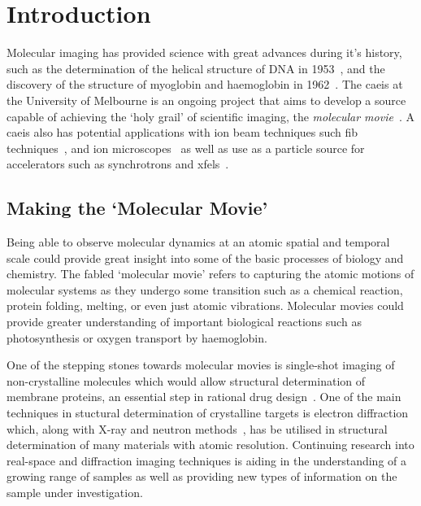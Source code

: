  \chapter{Introduction}
 
\setcounter{page}{1}

Molecular imaging has provided science with great advances during it's history, such as the determination of the helical structure of DNA in 1953~\cite{watson_molecular_1953}, and the discovery of the structure of myoglobin and haemoglobin in 1962~\cite{kendrew_x-ray_1957}.
The \gls{caeis} at the University of Melbourne is an ongoing project that aims to develop a source capable of achieving the `holy grail' of scientific imaging, the \emph{molecular movie}~\cite{dwyer_femtosecond_2006,sciaini_femtosecond_2011}.
A \gls{caeis} also has potential applications with ion beam techniques such \gls{fib} techniques~\cite{mcclelland_bright_2016}, and ion microscopes~\cite{knuffman_cold_2013} as well as use as a particle source for accelerators such as synchrotrons and \glspl{xfel}~\cite{van_oudheusden_electron_2007,zhu_future_2015,mcculloch_cold_2016}.

\section{Making the `Molecular Movie'}

Being able to observe molecular dynamics at an atomic spatial and temporal scale could provide great insight into some of the basic processes of biology and chemistry.
The fabled `molecular movie' refers to capturing the atomic motions of molecular systems as they undergo some transition such as a chemical reaction, protein folding, melting, or even just atomic vibrations.
Molecular movies could provide greater understanding of important biological reactions such as photosynthesis or oxygen transport by haemoglobin.

One of the stepping stones towards molecular movies is single-shot imaging of non-crystalline molecules which would allow structural determination of membrane proteins, an essential step in rational drug design~\cite{hardy_atomic_1987, barrett_discovering_1999, pinto_influenza_1992}.
One of the main techniques in stuctural determination of crystalline targets is electron diffraction which, along with X-ray and neutron methods~\cite{cullity_elements_2001,bacon_x-ray_2013}, has be utilised in structural determination of many materials with atomic resolution.
Continuing research into real-space and diffraction imaging techniques is aiding in the understanding of a growing range of samples as well as providing new types of information on the sample under investigation.

